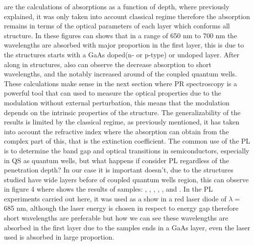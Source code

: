  are the calculations of absorptions as a function of depth, where previously explained, it was only taken into account classical regime therefore the absorption remains in terms of the optical parameters of each layer which conforms all structure. In these figures can shows that in a range of 650 nm to 700 nm the wavelengths are absorbed with major proportion in the first layer, this is due to the structures starts with a GaAs doped(n- or p-type) or undoped layer. After along in structures, also can observe the  decrease absorption to short wavelengths, and the notably increased around of the coupled quantum wells.  These calculations make sense in the next section where PR spectroscopy is a powerful tool that can used to measure the optical properties due to the modulation without external perturbation, this means that the modulation depends on the intrinsic properties of the structure. The generalizability of the results is limited by the classical regime, as previously mentioned, it has taken into account the refractive index where the absorption can obtain from the complex part of this,  that is the extinction coefficient. The common use of the PL is to determine the band gap and optical transitions in semiconductors, especially in QS as quantum wells, but what happens if consider PL regardless of the penetration depth? 
In our case it is important doesn't, due to the structures studied have wide layers before of coupled quantum wells region, this can observe in figure 4 where shows the results of samples: , , , , , and .  In the PL experiments carried out here,  it was used as a show in  a red laser diode 
of  $\lambda=$685 nm, although the laser energy is chosen in respect to energy gap therefore short wavelengths are preferable but how we can see these wavelengths are absorbed in the first layer due to the samples ends in a GaAs layer, even the laser used is absorbed in large proportion. 
